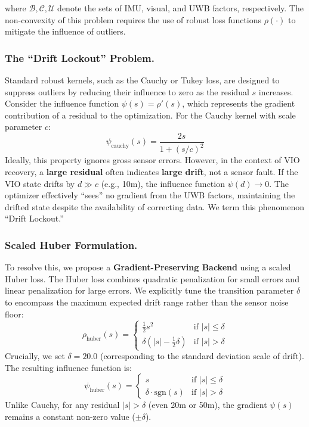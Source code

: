 \documentclass{svproc}
\begin{document}
where $\mathcal{B}, \mathcal{C}, \mathcal{U}$ denote the sets of IMU, visual, and UWB factors, respectively. The non-convexity of this problem requires the use of robust loss functions $\rho(\cdot)$ to mitigate the influence of outliers.

\subsubsection{The ``Drift Lockout'' Problem.}
Standard robust kernels, such as the Cauchy or Tukey loss, are designed to suppress outliers by reducing their influence to zero as the residual $s$ increases. Consider the influence function $\psi(s) = \rho'(s)$, which represents the gradient contribution of a residual to the optimization. For the Cauchy kernel with scale parameter $c$:
\begin{equation}
\psi_{\text{cauchy}}(s) = \frac{2s}{1 + (s/c)^2}
\end{equation}
Ideally, this property ignores gross sensor errors. However, in the context of VIO recovery, a \textbf{large residual} often indicates \textbf{large drift}, not a sensor fault. If the VIO state drifts by $d \gg c$ (e.g., 10m), the influence function $\psi(d) \to 0$. The optimizer effectively ``sees'' no gradient from the UWB factors, maintaining the drifted state despite the availability of correcting data. We term this phenomenon ``Drift Lockout.''

\subsubsection{Scaled Huber Formulation.}
To resolve this, we propose a \textbf{Gradient-Preserving Backend} using a scaled Huber loss. The Huber loss combines quadratic penalization for small errors and linear penalization for large errors. We explicitly tune the transition parameter $\delta$ to encompass the maximum expected drift range rather than the sensor noise floor:
\begin{equation}
\rho_{\text{huber}}(s) = \begin{cases} 
\frac{1}{2}s^2 & \text{if } |s| \le \delta \\
\delta(|s| - \frac{1}{2}\delta) & \text{if } |s| > \delta
\end{cases}
\end{equation}
Crucially, we set \textbf{$\delta = 20.0$} (corresponding to the standard deviation scale of drift). The resulting influence function is:
\begin{equation}
\psi_{\text{huber}}(s) = \begin{cases} 
s & \text{if } |s| \le \delta \\
\delta \cdot \text{sgn}(s) & \text{if } |s| > \delta
\end{cases}
\end{equation}
Unlike Cauchy, for any residual $|s| > \delta$ (even 20m or 50m), the gradient $\psi(s)$ remains a constant non-zero value ($\pm \delta$).
\end{document}
